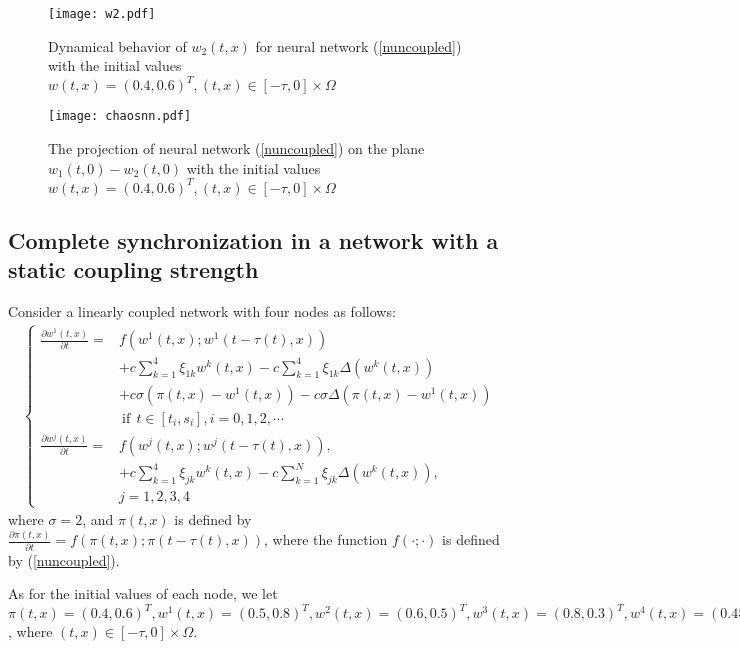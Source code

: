 \documentclass[review]{elsarticle}
\begin{document}
\begin{figure}
\begin{center}
\texttt{[image: w2.pdf]}
\end{center}
\caption{Dynamical behavior of $w_2(t,x)$ for neural network (\ref{nuncoupled}) with the initial values $w(t,x)=(0.4,0.6)^T, (t,x)\in [-\tau,0]\times\Omega$}\label{wf2}
\end{figure}

\begin{figure}
\begin{center}
\texttt{[image: chaosnn.pdf]}
\end{center}
\caption{The projection of neural network (\ref{nuncoupled}) on the plane $w_1(t,0)-w_2(t,0)$ with the initial values $w(t,x)=(0.4,0.6)^T, (t,x)\in [-\tau,0]\times\Omega$}\label{wf3}
\end{figure}

\subsection{Complete synchronization in a network with a static coupling strength}\label{n-static}
Consider a linearly coupled network with four nodes as follows:
\begin{align}\label{n-1}
\left\{
\begin{array}{cl}
\frac{\partial{w^1(t,x)}}{\partial{t}}=&f(w^1(t,x);w^1(t-\tau(t),x))\\
&+c\sum\limits_{k=1}^4\xi_{1k}
w^k(t,x)-c\sum\limits_{k=1}^4\xi_{1k}
\Delta(w^k(t,x))\\
&+c\sigma (\pi(t,x)-w^1(t,x))-c\sigma \Delta(\pi(t,x)-w^1(t,x))\\
&~\mathrm{if}~~t\in [t_i,s_i], i=0,1,2,\cdots\\
\frac{\partial{w^j(t,x)}}{\partial{t}}=&f(w^j(t,x);w^j(t-\tau(t),x)),\\
&+c\sum\limits_{k=1}^4\xi_{jk}
w^k(t,x)-c\sum\limits_{k=1}^N\xi_{jk}
\Delta(w^k(t,x)),\\
&j=1,2,3,4
\end{array}
\right.
\end{align}
where $\sigma=2$, and $\pi(t,x)$ is defined by $\frac{\partial{\pi}(t,x)}{\partial{t}}=f(\pi(t,x);\pi(t-\tau(t),x))$,
where the function $f(\cdot;\cdot)$ is defined by (\ref{nuncoupled}).

As for the initial values of each node, we let $\pi(t,x)=(0.4,0.6)^T, w^1(t,x)=(0.5, 0.8)^T, w^2(t,x)=(0.6,0.5)^T, w^3(t,x)=(0.8,0.3)^T, w^4(t,x)=(0.45,0.2)^T$, where $(t,x)\in [-\tau,0]\times\Omega$.
\end{document}

